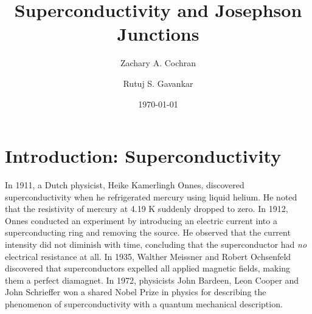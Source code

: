 \documentclass[letterpaper,english,reprint, aps]{revtex4}
\begin{document}

\title{Superconductivity and Josephson Junctions}

\author{Zachary A. Cochran}

\author{Rutuj S. Gavankar}  %

\date{\today}
\maketitle



\section{Introduction: Superconductivity} %
In 1911, a Dutch physicist, Heike Kamerlingh Onnes, discovered superconductivity when he refrigerated mercury using liquid helium. He noted that the resistivity of mercury at 4.19 \si{\kelvin} suddenly dropped to zero. In 1912, Onnes conducted an experiment by introducing an electric current into a superconducting ring and removing the source. He observed that the current intensity did not diminish with time, concluding that the superconductor had \emph{no} electrical resistance at all. In 1935, Walther Meissner and Robert Ochsenfeld discovered that superconductors expelled all applied magnetic fields, making them a perfect diamagnet. In 1972, physicists John Bardeen, Leon Cooper and John Schrieffer won a shared Nobel Prize in physics for describing the phenomenon of superconductivity with a quantum mechanical description.  
\end{document}
